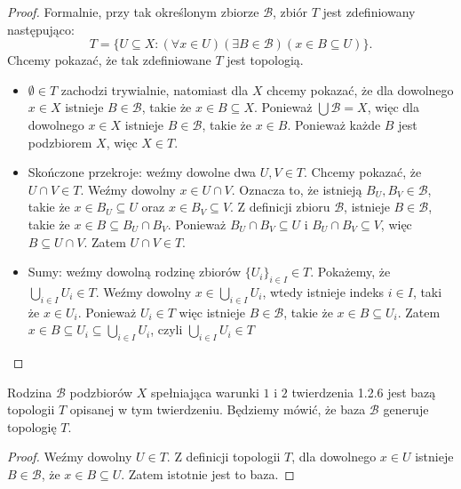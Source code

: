 \begin{proof}
Formalnie, przy tak określonym zbiorze $\mathcal{B}$, zbiór $T$ jest zdefiniowany następująco:
\[
T = \{U \subseteq X : \left(\forall x \in U \right)\left(\exists B \in \mathcal{B} \right) \left( x \in B \subseteq U \right)  \} 
.\] 
Chcemy pokazać, że tak zdefiniowane $T$ jest topologią.
\begin{itemize}
	\item $\emptyset \in T$ zachodzi trywialnie, natomiast dla $X$ chcemy pokazać, że dla dowolnego $x \in X$ istnieje $B \in \mathcal{B}$, takie że $x \in B \subseteq X$. Ponieważ $\bigcup \mathcal{B} = X$, więc dla dowolnego $x \in X$ istnieje $B \in \mathcal{B}$, takie że $x \in B$. Ponieważ każde $B$ jest podzbiorem $X$, więc $X \in T$.
	\item Skończone przekroje: weźmy dowolne dwa $U, V \in T$. Chcemy pokazać, że $U\cap V \in T$. Weźmy dowolny $x \in U\cap V$. Oznacza to, że istnieją $B_{U}, B_{V} \in \mathcal{B}$, takie że $x \in B_{U}\subseteq U$ oraz $x \in B_{V}\subseteq V$. Z definicji zbioru $\mathcal{B}$, istnieje $B \in \mathcal{B}$, takie że $x\in B\subseteq B_{U}\cap B_{V}$. Ponieważ $B_{U}\cap B_{V} \subseteq U$ i $B_{U}\cap B_{V} \subseteq V$, więc $B\subseteq U\cap V$. Zatem $U\cap V \in T$. 
	\item Sumy: weźmy dowolną rodzinę zbiorów $\{U_{i}\}_{i \in I} \in T$. Pokażemy, że $\bigcup_{i \in  I} U_{i} \in T$. Weźmy dowolny $x \in \bigcup_{i \in  I} U_{i}$, wtedy istnieje indeks $i\in I$, taki że $x \in U_{i}$. Ponieważ $U_{i} \in T$ więc istnieje $B\in \mathcal{B}$, takie że $x \in B \subseteq U_{i}$. Zatem $x \in B \subseteq U_{i} \subseteq \bigcup_{i \in  I} U_{i}$, czyli $\bigcup_{i \in  I} U_{i} \in T$
\end{itemize}
\end{proof} 
\begin{remark}[1.2.7]
	Rodzina $\mathcal{B}$ podzbiorów $X$ spełniająca warunki $1$ i $2$ twierdzenia 1.2.6 jest bazą topologii $T$ opisanej w tym twierdzeniu. Będziemy mówić, że baza $\mathcal{B}$ generuje topologię $T$.
\end{remark} 
\begin{proof}
	Weźmy dowolny $U \in T$. Z definicji topologii $T$, dla dowolnego $x \in U$ istnieje $B \in \mathcal{B}$, że $x \in B \subseteq U$. Zatem istotnie jest to baza.	
\end{proof} 

